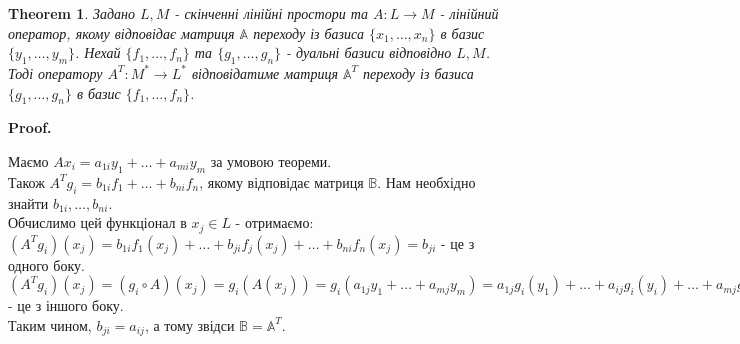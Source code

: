 \documentclass[a4paper, 10pt]{article}
\makeatletter
\theoremstyle{theoremdd}
\newtheorem{theorem}{Theorem}[subsection]
\newtheorem{definition}[theorem]{Definition}
\renewenvironment{proof}[1][Proof.\\]{\par
\pushQED{\hfill \qed}%
\normalfont \topsep6\p@\@plus6\p@\relax
\trivlist
\item\relax
{\bfseries
#1\@addpunct{.}}\hspace\labelsep\ignorespaces
}{%
\popQED\endtrivlist\@endpefalse
}
\makeatother
\begin{document}
\begin{theorem}
Задано $L,M$ - скінченні лінійні простори та $A \colon L \to M$ - лінійний оператор, якому відповідає матриця $\mathbb{A}$ переходу із базиса $\{x_1,\dots,x_n\}$ в базис $\{y_1,\dots,y_m\}$. Нехай $\{f_1,\dots,f_n\}$ та $\{g_1,\dots,g_n\}$ - дуальні базиси відповідно $L,M$. Тоді оператору $A^T \colon M^* \to L^*$ відповідатиме матриця $\mathbb{A}^T$ переходу із базиса $\{g_1,\dots,g_n\}$ в базис $\{f_1,\dots,f_n\}$.
\begin{figure}[H]
\centering
{}
\end{figure}
\end{theorem}

\begin{proof}
Маємо $A x_i = a_{1i}y_1 + \dots + a_{mi}y_m$ за умовою теореми.\\
Також $A^T g_i = b_{1i}f_1 + \dots + b_{ni}f_n$, якому відповідає матриця $\mathbb{B}$. Нам необхідно знайти $b_{1i},\dots,b_{ni}$.\\
Обчислимо цей функціонал в $x_j \in L$ - отримаємо:\\
$(A^T g_i)(x_j) = b_{1i}f_1(x_j) + \dots + b_{ji}f_j(x_j) + \dots + b_{ni}f_n(x_j) = b_{ji}$ - це з одного боку.\\
$(A^T g_i)(x_j) = (g_i \circ A)(x_j) = g_i(A(x_j)) = g_i(a_{1j}y_1 + \dots + a_{mj}y_m) = a_{1j}g_i(y_1) + \dots + a_{ij}g_i(y_i) + \dots + a_{mj}g_i(y_m) = a_{ij}$ - це з іншого боку.\\
Таким чином, $b_{ji} = a_{ij}$, а тому звідси $\mathbb{B} =\mathbb{A}^T$.
\end{proof}

\iffalse
\subsection{Фактор-оператори}
\begin{definition}
Задано: $A: L \to L$ - лінійний оператор.\\
\textbf{Фактор-оператором} називають оператор $A_{L/_M}: L/_M \to L/_M$, що задається таким чином:
\begin{align*}
A_{L/_M}(x + M) =  Ax + M
\end{align*}
\end{definition}
\fi
\end{document}
